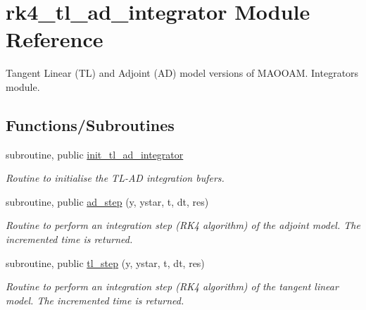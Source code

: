 \hypertarget{namespacerk4__tl__ad__integrator}{}\section{rk4\+\_\+tl\+\_\+ad\+\_\+integrator Module Reference}
\label{namespacerk4__tl__ad__integrator}


Tangent Linear (TL) and Adjoint (AD) model versions of M\+A\+O\+O\+AM. Integrators module.  


\subsection*{Functions/\+Subroutines}
\begin{DoxyCompactItemize}
\item 
subroutine, public \hyperlink{namespacerk4__tl__ad__integrator_aa219595db79d201625e347d3db633a6f}{init\+\_\+tl\+\_\+ad\+\_\+integrator}
\begin{DoxyCompactList}\small\item\em Routine to initialise the T\+L-\/\+AD integration bufers. \end{DoxyCompactList}\item 
subroutine, public \hyperlink{namespacerk4__tl__ad__integrator_a72dadb6500707116e5864c89343dcae0}{ad\+\_\+step} (y, ystar, t, dt, res)
\begin{DoxyCompactList}\small\item\em Routine to perform an integration step (R\+K4 algorithm) of the adjoint model. The incremented time is returned. \end{DoxyCompactList}\item 
subroutine, public \hyperlink{namespacerk4__tl__ad__integrator_a029c30f23bfe421a13788e75cc03b8d3}{tl\+\_\+step} (y, ystar, t, dt, res)
\begin{DoxyCompactList}\small\item\em Routine to perform an integration step (R\+K4 algorithm) of the tangent linear model. The incremented time is returned. \end{DoxyCompactList}\end{DoxyCompactItemize}
